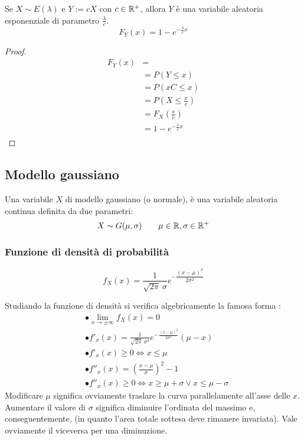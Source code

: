 \begin{prop}
	Se $X\sim E(\lambda)$ e $Y:=cX$ con $c\in\mathbb R^+$, allora $Y$ è una variabile aleatoria esponenziale di parametro $\frac{\lambda}{c}$.
	\begin{equation*}
		F_Y(x) = 1 - e^{-\frac{\lambda}{c} x}
	\end{equation*}
\end{prop}
\begin{proof}
	\begin{align*}
		F_Y(x) & =                                  \\
		       & = P(Y \leq x)                      \\
		       & = P(xC \leq x)                     \\
		       & = P\left(X \leq \frac{x}{c}\right) \\
		       & = F_X\left(\frac{x}{c}\right)      \\
		       & = 1 - e^{-\frac{\lambda}{c} x}     \\
	\end{align*}
\end{proof}


\subsection{Modello gaussiano}
Una variabile $X$ di modello gaussiano (o normale), è una variabile aleatoria continua definita da due parametri:
\begin{equation*}
	X\sim G(\mu, \sigma)\qquad \mu\in\mathbb R,\sigma\in\mathbb R^+
\end{equation*}


\subsubsection{Funzione di densità di probabilità}
\begin{equation*}
	f_X(x) = \frac{1}{\sqrt{2\pi}~\sigma}e^{-\dfrac{(x-\mu)^2}{2\sigma^2}}
\end{equation*}

Studiando la funzione di densità si verifica algebricamente la famosa forma :
\begin{align*}
	 & \bullet \lim_{x\to\pm\infty} f_X(x) = 0                                                 \\
	 & \bullet f'_x(x) = \frac{1}{\sqrt{2\pi}~\sigma^3}e^{-\frac{(x-\mu)^2}{2\sigma^2}}(\mu-x) \\
	 & \bullet f'_x(x) \geq 0 \Leftrightarrow x\leq\mu                                         \\
	 & \bullet f''_x(x) = \left(\frac{x-\mu}{\sigma}\right)^2 - 1                              \\
	 & \bullet f''_x(x) \geq 0 \Leftrightarrow x\geq \mu+\sigma \lor x\leq \mu-\sigma
\end{align*}
Modificare $\mu$ significa ovviamente traslare la curva parallelamente all'asse delle $x$. Aumentare il valore di $\sigma$ significa diminuire l'ordinata del massimo e, conseguentemente,  (in quanto l'area totale sottesa deve rimanere invariata). Vale ovviamente il viceversa per una diminuzione.

